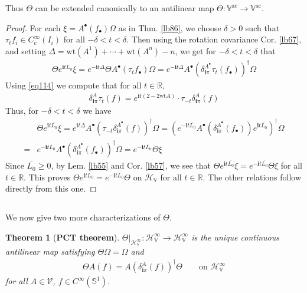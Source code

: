 \documentclass[12pt,b5paper,notitlepage]{article}
\theoremstyle{definition}
\theoremstyle{plain}
\newtheorem{thm}[df]{Theorem}
\newcommand{\ovl}{\overline}
\newcommand{\im}{\mathbf{i}}
\newcommand{\blt}{\bullet}
\newcommand{\Vbb}{\mathbb V}
\newcommand{\Rbb}{\mathbb R}
\newcommand{\wt}{\mathrm{wt}}
\newcommand{\Sbb}{{\mathbb S}}
\newcommand{\HV}{\mathcal H_{\mathbb V}}
\newcommand{\ac}{\mathrm{ac}}
\newcommand{\MV}{\mathcal V}
\numberwithin{equation}{section}
\begin{document}
Thus $\Theta$ can be extended canonically to an antilinear map $\Theta:\Vbb^\ac\rightarrow\Vbb^\ac$.

\begin{proof}
For each $\xi=A^\blt(f_\blt)\Omega$ as in Thm. \ref{lb86}, we choose $\delta>0$ such that $\tau_tf_i\in C_c^\infty(I_i)$ for all $-\delta<t<\delta$.  Then using the rotation covariance Cor. \ref{lb67}, and setting $\Delta=\wt(A^1)+\cdots+\wt(A^n)-n$, we get for $-\delta<t<\delta$ that
\begin{align*}
\Theta e^{\im t\ovl{L_0}}\xi=e^{-\im t\Delta}\Theta A^\blt(\tau_tf_\blt)\Omega=e^{-\im t\Delta}A^\blt(\delta^{A^\blt}_{\im\pi}\tau_t(f_\blt))^\dagger\Omega
\end{align*}
Using \eqref{eq114} we compute that for all $t\in\Rbb$,
\begin{align}\label{eq123}
\delta_{\im\pi}^A \tau_t(f)=e^{\im t(2-2\wt A)}\cdot \tau_{-t}\delta_{\im\pi}^A(f)
\end{align}
Thus, for $-\delta<t<\delta$ we have
\begin{align*}
&\Theta e^{\im t\ovl{L_0}}\xi=e^{\im t\Delta}A^\blt(\tau_{-t}\delta^{A^\blt}_{\im\pi}(f))^\dagger\Omega=(e^{-\im t\ovl{L_0}}A^\blt(\delta^{A^\blt}_{\im\pi}(f_\blt))e^{\im t\ovl{L_0}})^\dagger\Omega\\
=&e^{-\im t\ovl{L_0}}A^\blt(\delta^{A^\blt}_{\im\pi}(f_\blt))^\dagger\Omega=e^{-\im t\ovl{L_0}}\Theta\xi
\end{align*}
Since $\ovl{L_0}\geq0$, by Lem. \ref{lb55} and Cor. \ref{lb57}, we see that $\Theta e^{\im t\ovl{L_0}}\xi=e^{-\im t\ovl{L_0}}\Theta\xi$ for all $t\in\Rbb$. This proves $\Theta e^{\im t\ovl{L_0}}=e^{-\im t\ovl{L_0}}\Theta$ on $\HV$ for all $t\in\Rbb$. The other relations follow directly from this one.
\end{proof}



\subsection{}

We now give two more characterizations of $\Theta$.


\begin{thm}[\textbf{PCT theorem}]\label{lb89}
$\Theta|_{\HV^\infty}:\HV^\infty\rightarrow\HV^\infty$ is the unique continuous antilinear map satisfying $\Theta\Omega=\Omega$ and
\begin{align}\label{eq122}
\Theta A(f)=A(\delta^A_{\im\pi}(f))^\dagger\Theta \qquad\text{on }\HV^\infty
\end{align}
for all $A\in\MV$, $f\in C^\infty(\Sbb^1)$. 
\end{thm}
\end{document}
